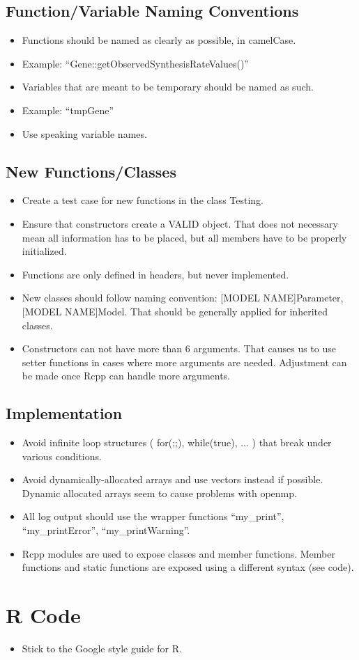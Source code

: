 \documentclass[letter,10pt]{article}
\newcommand{\sep}{\discretionary{}{}{}} %
\begin{document}
\subsection{Function/Variable Naming Conventions}
\begin{itemize}
    \item Functions should be named as clearly as possible, in camelCase.
    \item Example: \enquote{Gene::getObservedSynthesisRateValues()}
    \item Variables that are meant to be temporary should be named as such.
    \item Example: \enquote{tmpGene}
    \item Use speaking variable names.
\end{itemize}

\subsection{New Functions/Classes}
\begin{itemize}
    \item Create a test case for new functions in the class Testing.
    \item Ensure that constructors create a VALID object. 
    That does not necessary mean all information has to be placed, but all members have to be properly initialized. 
    \item Functions are only defined in headers, but never implemented.
    \item New classes should follow naming convention: [MODEL NAME]\sep Parameter, [MODEL NAME]\sep Model.
    That should be generally applied for inherited classes.
    \item Constructors can not have more than 6 arguments. 
    That causes us to use setter functions in cases where more arguments are needed. 
    Adjustment can be made once Rcpp can handle more arguments.
\end{itemize}

\subsection{Implementation}
\begin{itemize}
    \item Avoid infinite loop structures ( for(;;), while(true), ... ) that break under various conditions.
    \item Avoid dynamically-allocated arrays and use vectors instead if possible.
    Dynamic allocated arrays seem to cause problems with openmp.
    \item All log output should use the wrapper functions \enquote{my\sep \_print}, \enquote{my\sep \_printError}, \enquote{my\sep \_printWarning}.
    \item Rcpp modules are used to expose classes and member functions. Member functions and static functions are exposed using a different syntax (see code). 
\end{itemize}

\section{R Code}
\begin{itemize}
    \item Stick to the Google style guide for R.
\end{itemize}
\end{document}
